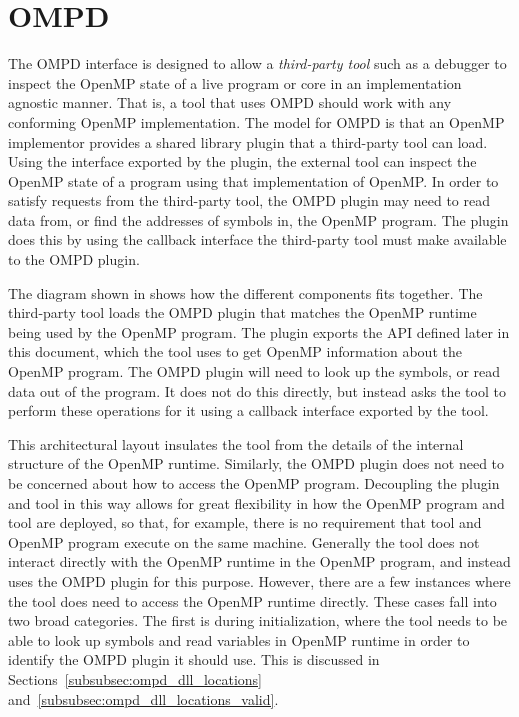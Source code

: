 \section{OMPD}
\label{sec:ompd-overview}
\label{sec:third-party-tool-callback-interface}

The OMPD interface is designed to allow a \emph{third-party tool}
such as a debugger to inspect the OpenMP state of a live program
or core in an implementation agnostic manner.
That is, a tool that uses OMPD should work with any conforming
OpenMP implementation.
The model for OMPD is that an OpenMP implementor provides a shared
library plugin that a third-party tool can load.
Using the interface exported by the plugin, the external tool can
inspect the OpenMP state of a program using that implementation of OpenMP.
In order to satisfy requests from the third-party tool, the OMPD plugin
may need to read data from, or find the addresses of symbols in,
the OpenMP program.
The plugin does this by using the callback interface the third-party
tool must make available to the OMPD plugin.

%    


The diagram shown in   shows how the different
components fits together.
The third-party tool loads the OMPD plugin that matches the OpenMP runtime
being used by the OpenMP program.
The plugin exports the API defined later in this document,
which the tool uses to get OpenMP information about the OpenMP program.
The OMPD plugin will need to look up the symbols,
or read data out of the program.
It does not do this directly, but instead asks the tool to perform
these operations for it using a callback interface exported by the tool.

This architectural layout insulates the tool from the details
of the internal structure of the OpenMP runtime.
Similarly, the OMPD plugin does not need to be concerned about
how to access the OpenMP program.
Decoupling the plugin and tool in this way allows for
great flexibility in how the OpenMP program and tool are deployed,
so that, for example, there is no requirement that tool
and OpenMP program execute on the same machine.
Generally the tool does not interact directly with the OpenMP
runtime in the OpenMP program, and instead uses the OMPD plugin
for this purpose.
However, there are a few instances where the tool does need
to access the OpenMP runtime directly.
These cases fall into two broad categories.
The first is during initialization, where the tool needs
to be able to look up symbols and read variables in OpenMP runtime
in order to identify the OMPD plugin it should use.
This is discussed in Sections~\ref{subsubsec:ompd_dll_locations}
and~\ref{subsubsec:ompd_dll_locations_valid}.

